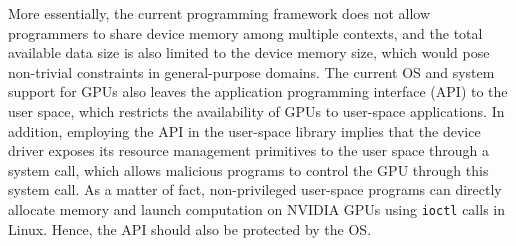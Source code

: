 More essentially, the current programming framework does not allow
programmers to share device memory among multiple contexts, and the
total available data size is also limited to the device memory size,
which would pose non-trivial constraints in general-purpose domains.
The current OS and system support for GPUs also leaves the application
programming interface (API) to the user space, which restricts the
availability of GPUs to user-space applications.
In addition, employing the API in the user-space library implies that
the device driver exposes its resource management primitives to the user
space through a system call, which allows malicious programs to control
the GPU through this system call. 
As a matter of fact, non-privileged user-space programs can directly
allocate memory and launch computation on NVIDIA GPUs using
\texttt{ioctl} calls in Linux.
Hence, the API should also be protected by the OS.

